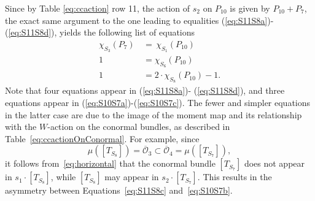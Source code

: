 \documentclass[a4paper, 11pt]{article}
\begin{document}
Since by Table \ref{eq:ccaction} row 11,
the action of $s_{2}$ 
on $P_{10}$ is given by $P_{10}+P_{7}$, 
the exact same argument to the one 
leading to equalities (\ref{eq:S11S8a})-(\ref{eq:S11S8d}),
yields the following list of equations
\begin{align}
\chi^{}_{S_3}(P_7)\, &=\, 
\chi^{}_{S_1}(P_{10})\label{eq:S10S7a}\\
1&=\chi^{}_{S_6}(P_{10})\label{eq:S10S7b}\\
1&=2\cdot \chi^{}_{S_8}(P_{10}) -1.\label{eq:S10S7c}
\end{align}
Note that four equations appear in
  (\ref{eq:S11S8a})- (\ref{eq:S11S8d}), and  three equations appear in
(\ref{eq:S10S7a})-(\ref{eq:S10S7c}).  The fewer and simpler
  equations in the latter case are due to the image of the moment map
  and its relationship with the $W$-action on 
the conormal bundles, as described in
Table~\ref{eq:ccactionOnConormal}. For example, since 
\[
\mu([T_{S_8}]) = \overline{\mathcal{O}}_3 \subset
\overline{\mathcal{O}}_4 = \mu([T_{S_7}]), 
\]
it follows from~\eqref{eq:horizontal} that the conormal bundle
$[T_{S_7}]$ does not appear in $s_{1} \cdot [T_{S_8}]$, while 
$[T_{S_8}]$ may appear in $s_{2} \cdot [T_{S_7}]$. This results in the
asymmetry between Equations~\eqref{eq:S11S8c} and~\eqref{eq:S10S7b}. 
\end{document}
